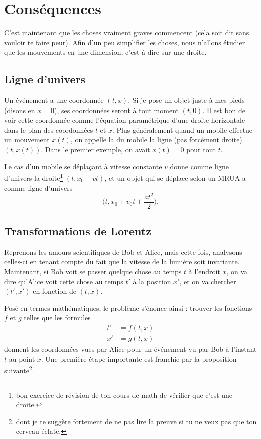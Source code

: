 \section{Conséquences}

C'est maintenant que les choses vraiment graves commencent (cela soit dit sans vouloir te faire peur). Afin d'un peu simplifier les choses, nous n'allons  étudier que les mouvements en une dimension, c'est-à-dire sur une droite.

\subsection{Ligne d'univers}

Un événement a une coordonnée \( (t,x)\). Si je pose un objet juste à mes pieds (disons en \( x=0\)), ses coordonnées seront à tout moment \( (t,0)\). Il est bon de voir cette coordonnée comme l'équation paramétrique d'une droite horizontale dans le plan des coordonnées \( t\) et \( x\). Plus généralement quand un mobile effectue un mouvement \( x(t)\), on appelle la  du mobile la ligne (pas forcément droite) \( (t,x(t))\). Dans le premier exemple, on avait \( x(t)=0\) pour tout \( t\).

Le cas d'un mobile se déplaçant à vitesse constante \( v\) donne comme ligne d'univers la droite\footnote{bon exercice de révision de ton cours de math de vérifier que c'est une droite.} \( (t,x_0+vt)\), et un objet qui se déplace selon un MRUA a comme ligne d'univers
\[
	\big( t, x_0+v_0t+\frac{ at^2 }{ 2 } \big).
\]

\subsection{Transformations de Lorentz}

Reprenons les amours scientifiques de Bob et Alice, mais cette-fois, analysons celles-ci en tenant compte du fait que la vitesse de la lumière soit invariante. Maintenant, si Bob voit se passer quelque chose au temps \( t\) à l'endroit \( x\), on va dire qu'Alice voit cette chose au temps \( t'\) à la position \( x'\), et on va chercher \( (t',x')\) en fonction de \( (t,x)\).

Posé en termes mathématiques, le problème s'énonce ainsi : trouver les fonctions \( f\) et \( g\) telles que les formules
\begin{subequations}	\label{SubEqLorGen}
	\begin{align}
		t' & =f(t,x) \\
		x' & =g(t,x)
	\end{align}
\end{subequations}
donnent les coordonnées vues par Alice pour un événement vu par Bob à l'instant \( t\) au point \( x\). Une première étape importante est franchie par la proposition suivante\footnote{dont je te suggère fortement de ne pas lire la preuve si tu ne veux pas que ton cerveau éclate.}.

